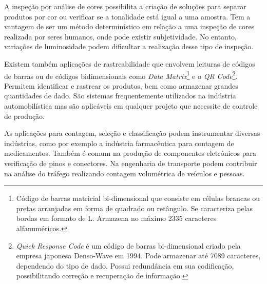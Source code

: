 A inspeção por análise de cores possibilita a criação de soluções para separar produtos por cor ou verificar se a tonalidade está igual a uma amostra. Tem a vantagem de ser um método determinístico em relação a uma inspeção de cores realizada por seres humanos, onde pode existir subjetividade. No entanto, variações de luminosidade podem dificultar a realização desse tipo de inspeção.

Existem também aplicações de rastreabilidade que envolvem leituras de códigos de barras ou de códigos bidimensionais como \textit{Data Matrix}\footnote{Código de barras matricial bi-dimensional que consiste em células brancas ou pretas arranjadas em forma de quadrado ou retângulo. Se caracteriza pelas bordas em formato de L. Armazena no máximo 2335 caracteres alfanuméricos.} e o \textit{QR Code}\footnote{\textit{Quick Response Code} é um código de barras bi-dimensional criado pela empresa japonesa Denso-Wave em 1994. Pode armazenar até 7089 caracteres, dependendo do tipo de dado. Possui redundância em sua codificação, possibilitando correção e recuperação de informação.}. Permitem identificar e rastrear os produtos, bem como armazenar grandes quantidades de dado. São sistemas frequentemente utilizados na indústria automobilística mas são aplicáveis em qualquer projeto que necessite de controle de produção.

As aplicações para contagem, seleção e classificação podem instrumentar diversas indústrias, como por exemplo a indústria farmacêutica para contagem de medicamentos. Também é comum na produção de componentes eletrônicos para verificação de pinos e conectores. Na engenharia de transporte podem contribuir na análise do tráfego realizando contagem volumétrica de veículos e pessoas.